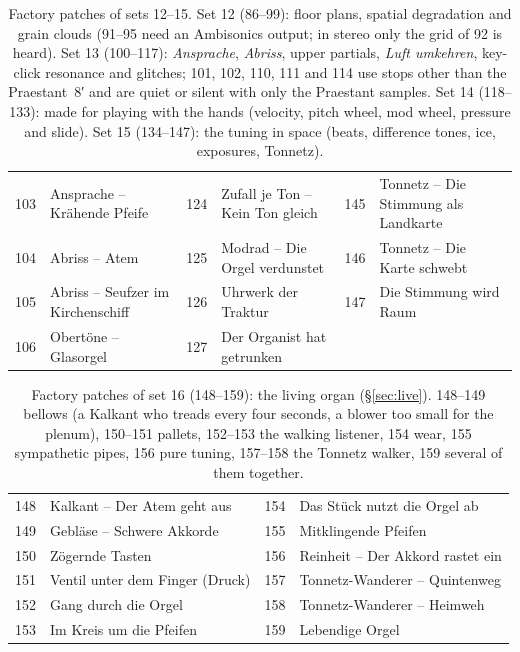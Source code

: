 \documentclass[11pt,a4paper,parskip=half,DIV=11,toc=bibliography]{scrartcl}
\newcommand{\ui}[1]{\emph{#1}}                 %
\begin{document}
\begin{table}[ht]
{\begin{tabular}{@{}rl rl rl@{}}
103 & Ansprache – Krähende Pfeife & 124 & Zufall je Ton – Kein Ton gleich & 145 & Tonnetz – Die Stimmung als Landkarte \\
104 & Abriss – Atem & 125 & Modrad – Die Orgel verdunstet & 146 & Tonnetz – Die Karte schwebt \\
105 & Abriss – Seufzer im Kirchenschiff & 126 & Uhrwerk der Traktur & 147 & Die Stimmung wird Raum \\
106 & Obertöne – Glasorgel & 127 & Der Organist hat getrunken &  &  \\
\bottomrule
\end{tabular}}
\caption{Factory patches of sets 12--15. Set 12 (86--99): floor plans, spatial degradation and grain clouds (91--95 need an
Ambisonics output; in stereo only the grid of 92 is heard). Set 13 (100--117): \ui{Ansprache}, \ui{Abriss}, upper partials,
\ui{Luft umkehren}, key-click resonance and glitches; 101, 102, 110, 111 and 114 use stops other than the Praestant~8′ and are
quiet or silent with only the Praestant samples. Set 14 (118--133): made for playing with the hands (velocity, pitch wheel,
mod wheel, pressure and slide). Set 15 (134--147): the tuning in space (beats, difference tones, ice, exposures, Tonnetz).}
\label{tab:patches2}
\end{table}

\begin{table}[ht]
\centering\small
\begin{tabular}{@{}rl@{\hspace{2em}}rl@{}}
\toprule
148 & Kalkant – Der Atem geht aus & 154 & Das Stück nutzt die Orgel ab \\
149 & Gebläse – Schwere Akkorde & 155 & Mitklingende Pfeifen \\
150 & Zögernde Tasten & 156 & Reinheit – Der Akkord rastet ein \\
151 & Ventil unter dem Finger (Druck) & 157 & Tonnetz-Wanderer – Quintenweg \\
152 & Gang durch die Orgel & 158 & Tonnetz-Wanderer – Heimweh \\
153 & Im Kreis um die Pfeifen & 159 & Lebendige Orgel \\
\bottomrule
\end{tabular}
\caption{Factory patches of set 16 (148--159): the living organ (\S\ref{sec:live}). 148--149 bellows (a Kalkant who treads every four seconds,
a blower too small for the plenum), 150--151 pallets, 152--153 the walking listener, 154 wear, 155 sympathetic pipes, 156 pure
tuning, 157--158 the Tonnetz walker, 159 several of them together.}
\label{tab:patches3}
\end{table}
\end{document}
